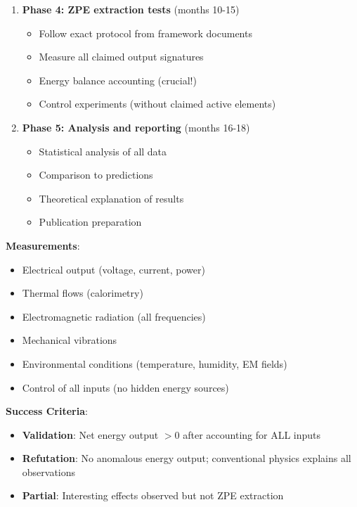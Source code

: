 \begin{enumerate}
    \item \textbf{Phase 4: ZPE extraction tests} (months 10-15)
    \begin{itemize}
        \item Follow exact protocol from framework documents
        \item Measure all claimed output signatures
        \item Energy balance accounting (crucial!)
        \item Control experiments (without claimed active elements)
    \end{itemize}

    \item \textbf{Phase 5: Analysis and reporting} (months 16-18)
    \begin{itemize}
        \item Statistical analysis of all data
        \item Comparison to predictions
        \item Theoretical explanation of results
        \item Publication preparation
    \end{itemize}
\end{enumerate}

\textbf{Measurements}:
\begin{itemize}
    \item Electrical output (voltage, current, power)
    \item Thermal flows (calorimetry)
    \item Electromagnetic radiation (all frequencies)
    \item Mechanical vibrations
    \item Environmental conditions (temperature, humidity, EM fields)
    \item Control of all inputs (no hidden energy sources)
\end{itemize}

\textbf{Success Criteria}:
\begin{itemize}
    \item \textbf{Validation}: Net energy output $> 0$ after accounting for ALL inputs
    \item \textbf{Refutation}: No anomalous energy output; conventional physics explains all observations
    \item \textbf{Partial}: Interesting effects observed but not ZPE extraction
\end{itemize}


